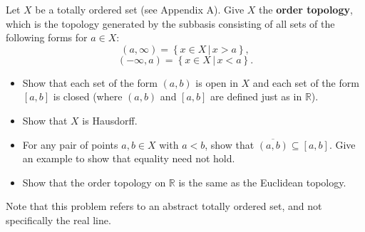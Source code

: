 \documentclass[12pt]{article}
\newenvironment{problem}[2][Problem]{\begin{trivlist}
\item[\hskip \labelsep {\bfseries #1}\hskip \labelsep {\bfseries #2.}]}{\end{trivlist}}
\begin{document}
\begin{problem}{2-13}
Let $X$ be a totally ordered set (see Appendix A). Give $X$ the \textbf{order topology}, which is the topology generated by the subbasis consisting of all sets of the following forms for $a\in X$:
$$ \left(a,\infty\right) = \left\{x\in X \, | \, x>a\right\}, $$
$$ \left(-\infty,a\right) = \left\{x\in X\, | \, x<a\right\}.$$
\begin{itemize}
	\item Show that each set of the form $\left(a,b\right)$ is open in $X$ and each set of the form $\left[a,b\right]$ is closed (where $\left(a,b\right)$ and $\left[a,b\right]$ are defined just as in $\mathbb{R}$).
	\item Show that $X$ is Hausdorff.
	\item For any pair of points $a,b\in X$ with $a<b$, show that $\overline{\left(a,b\right)} \subseteq \left[a,b\right]$. Give an example to show that equality need not hold.
	\item Show that the order topology on $\mathbb{R}$ is the same as the Euclidean topology.
\end{itemize}
\end{problem}
{\color{red}Note that this problem refers to an abstract totally ordered set, and not specifically the real line.}
\end{document}
